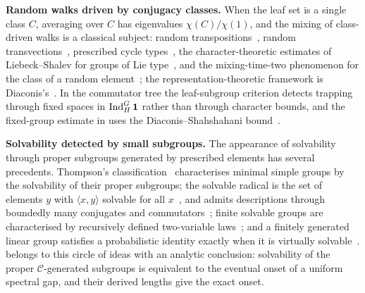\medskip\noindent\textbf{Random walks driven by conjugacy classes.}
When the leaf set is a single class $C$, averaging over $C$ has
eigenvalues $\chi(C)/\chi(1)$, and the mixing of class-driven walks is a
classical subject: random transpositions~\cite{DS81}, random
transvections~\cite{Hildebrand1992}, prescribed cycle
types~\cite{LulovPak,Roichman1996}, the character-theoretic estimates of
Liebeck--Shalev for groups of Lie type~\cite{LiebeckShalev2005}, and the
mixing-time-two phenomenon for the class of a random
element~\cite{Shalev2008}; the representation-theoretic framework is
Diaconis's~\cite{Diaconis1988}. In the commutator tree the leaf-subgroup
criterion detects trapping through fixed spaces in $\operatorname{Ind}_H^G\mathbf1$
rather than through character bounds, and the fixed-group estimate in
 uses the Diaconis--Shahshahani bound~\cite{DS81}.

\medskip\noindent\textbf{Solvability detected by small subgroups.}
The appearance of solvability through proper subgroups generated by
prescribed elements has several precedents. Thompson's
classification~\cite{Thompson1968} characterises minimal simple groups
by the solvability of their proper subgroups; the solvable radical is the
set of elements $y$ with $\langle x,y\rangle$ solvable for all
$x$~\cite{GKPS2006}, and admits descriptions through boundedly many
conjugates and commutators~\cite{GGKP2008}; finite solvable groups are
characterised by recursively defined two-variable
laws~\cite{Bandman2006,BrayWilsonWilson2005}; and a finitely generated
linear group satisfies a probabilistic identity exactly when it is
virtually solvable~\cite{LarsenShalev2016}.  belongs to this
circle of ideas with an analytic conclusion: solvability of the proper
$\mathcal C$-generated subgroups is equivalent to the eventual onset of a
uniform spectral gap, and their derived lengths give the exact onset.

